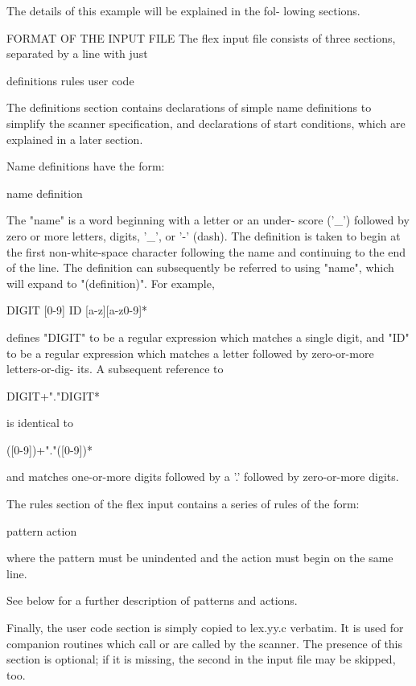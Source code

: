 \documentclass[12pt,spanish,twocolumn,lettersize]{article}
\begin{document}
       The details of this example will be explained in the  fol-
       lowing sections.

FORMAT OF THE INPUT FILE
       The  flex input file consists of three sections, separated
       by a line with just %

	   definitions
	   rules
	   user code

       The definitions section contains	 declarations  of  simple
       name  definitions  to  simplify the scanner specification,
       and declarations of start conditions, which are	explained
       in a later section.

       Name definitions have the form:

	   name definition

       The  "name" is a word beginning with a letter or an under-
       score ('_') followed by zero or more letters, digits, '_',
       or  '-'	(dash).	  The definition is taken to begin at the
       first non-white-space character	following  the	name  and
       continuing  to  the  end	 of the line.  The definition can
       subsequently be referred to  using  "{name}",  which  will
       expand to "(definition)".  For example,

	   DIGIT    [0-9]
	   ID	    [a-z][a-z0-9]*

       defines "DIGIT" to be a regular expression which matches a
       single digit, and "ID" to be a  regular	expression  which
       matches	a letter followed by zero-or-more letters-or-dig-
       its.  A subsequent reference to

	   {DIGIT}+"."{DIGIT}*

       is identical to

	   ([0-9])+"."([0-9])*

       and matches one-or-more digits followed by a '.'	 followed
       by zero-or-more digits.

       The  rules  section of the flex input contains a series of
       rules of the form:

	   pattern   action

       where the pattern must be unindented and the  action  must
       begin on the same line.

       See  below  for	a  further  description	 of  patterns and
       actions.

       Finally,	 the  user  code  section  is  simply  copied  to
       lex.yy.c	 verbatim.   It	 is  used  for companion routines
       which call or are called by the scanner.	 The presence  of
       this  section is optional; if it is missing, the second %
       in the input file may be skipped, too.
\end{document}
